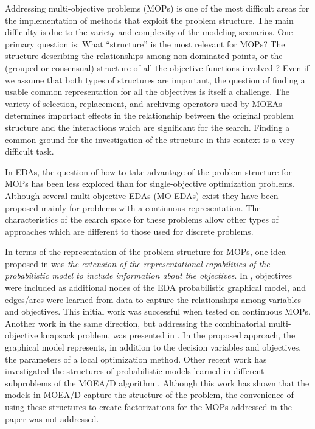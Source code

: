 \documentclass{article} %
\begin{document}
 Addressing multi-objective problems (MOPs) is one of the most difficult areas for the implementation of methods that exploit the problem structure. The main difficulty is due to the variety and complexity of the modeling scenarios. One primary question is: What ``structure'' is the most relevant for MOPs? The structure describing the relationships among non-dominated points, or the (grouped or consensual) structure of all the objective functions involved ? Even if we assume that both types of structures are important, the question of finding a usable common representation for all the objectives is itself a challenge. The variety of selection, replacement, and archiving operators used by MOEAs determines important effects in the relationship  between the original problem structure and the interactions which are significant for the search. Finding a common ground for the investigation of the structure in this context is a very difficult task. 

 In EDAs, the question of how to take advantage of the problem structure for MOPs has been less explored than for single-objective optimization problems. Although several multi-objective EDAs (MO-EDAs) exist \cite{Bosman_and_Thierens:2002,Costa_and_Minisci:2003,Laumanns_and_Ocenasek:2002,Marti_et_al:2010,Pelikan_et_al:2006a,Zhang_et_al:2008,Zhou_et_al:2009} they have been proposed mainly for problems with a continuous representation. The characteristics of the search space for these problems allow other types of approaches which are different to those used for discrete problems. 

 In terms of the representation of the problem structure for MOPs, one idea proposed in \cite{Santana_et_al:2009b} was  \emph{the extension of the  representational capabilities of the probabilistic model to include information about the objectives}.  In  \cite{Karshenas_et_al:2014},  objectives were included as  additional nodes of the EDA probabilistic graphical model, and edges/arcs  were learned from data  to capture the relationships among variables and objectives. This initial work was successful when tested on continuous MOPs. Another work in the same direction, but addressing the combinatorial multi-objective knapsack problem, was presented in \cite{Martins_et_al:2016}. In the proposed approach, the graphical model represents, in addition to the decision variables and objectives, the parameters of a local optimization method. Other recent work \cite{Zangari_et_al:2016,Zangari_et_al:2015} has investigated  the structures of probabilistic models learned in different subproblems of the MOEA/D  algorithm \cite{Zhang_and_Li:2007}. Although this work has shown that the models in MOEA/D capture the structure of the problem, the convenience of using these structures to create factorizations for the  MOPs addressed in the paper was not addressed. 
\end{document}
